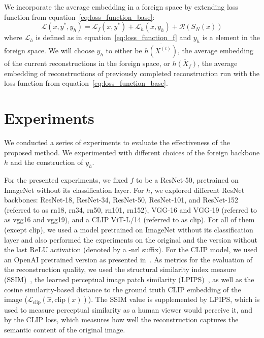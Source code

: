 \documentclass[10pt,twocolumn]{article}
\begin{document}
We incorporate the average embedding in a foreign space by extending loss function from equation~\ref{eq:loss_function_base}:
\begin{equation}\label{eq:loss_function}
\mathcal{L}(x, y^*, y_h) = \mathcal{L}_{f}(x, y^*) + \mathcal{L}_{h}(x, y_h) + \mathcal{R}(S_N(x))
\end{equation}
where $\mathcal{L}_{h}$ is defined as in equation~\ref{eq:loss_function_f} and $y_h$ is a element in the foreign space.
We will choose $y_h$ to either be $\overline{h(X^{(t)})}$, the average embedding of the current reconstructions in the foreign space, or $\overline{h(X_f)}$, the average embedding of reconstructions of previously completed reconstruction run with the loss function from equation~\ref{eq:loss_function_base}.

\section{Experiments}
We conducted a series of experiments to evaluate the effectiveness of the proposed method.
We experimented with different choices of the foreign backbone $h$ and the construction of $y_h$.

For the presented experiments, we fixed $f$ to be a ResNet-50, pretrained on ImageNet without its classification layer.
For $h$, we explored different ResNet backbones: ResNet-18, ResNet-34, ResNet-50, ResNet-101, and ResNet-152 (referred to as rn18, rn34, rn50, rn101, rn152), VGG-16 and VGG-19 (referred to as vgg16 and vgg19), and a CLIP ViT-L/14 (referred to as clip).
For all of them (except clip), we used a model pretrained on ImageNet without its classification layer and also performed the experiments on the original and the version without the last ReLU activation (denoted by a -nrl suffix).
For the CLIP model, we used an OpenAI pretrained version as presented in~\cite{radfordLearningTransferableVisual2021}.
As metrics for the evaluation of the reconstruction quality, we used the structural similarity index measure (SSIM)~\cite{zhouwangImageQualityAssessment2004}, the learned perceptual image patch similarity (LPIPS)~\cite{zhangUnreasonableEffectivenessDeep2018}, as well as the cosine similarity-based distance to the ground truth CLIP embedding of the image ($\mathcal{L}_{\text{clip}}(\hat x, \text{clip}(x))$).
The SSIM value is supplemented by LPIPS, which is used to measure perceptual similarity as a human viewer would perceive it, and by the CLIP loss, which measures how well the reconstruction captures the semantic content of the original image.
\end{document}
